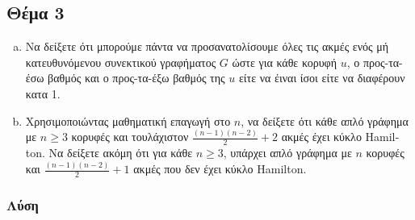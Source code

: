 \documentclass{assignment}
\begin{document}
\newpage\subsection*{Θέμα 3}

\begin{enumerate}[(a)]

\item
Να δείξετε ότι μπορούμε πάντα να προσανατολίσουμε όλες τις ακμές ενός μή κατευθυνόμενου συνεκτικού γραφήματος $G$ ώστε
για κάθε κορυφή $u$, ο προς-τα-έσω βαθμός και ο προς-τα-έξω βαθμός της $u$ είτε να έιναι ίσοι είτε να διαφέρουν κατα 1.

\item
Χρησιμοποιώντας μαθηματική επαγωγή στο $n$, να δείξετε ότι κάθε απλό γράφημα με $n \ge 3$ κορυφές και τουλάχιστον 
$\frac{(n-1)(n-2)}{2} +2$ ακμές έχει κύκλο \textlatin{Hamilton}. Να δείξετε ακόμη ότι για κάθε $n \ge 3$, υπάρχει 
απλό γράφημα με $n$ κορυφές και $\frac{(n-1)(n-2)}{2} + 1$ ακμές που δεν έχει κύκλο \textlatin{Hamilton}.

\end{enumerate}

\subsubsection*{Λύση}
\end{document}
